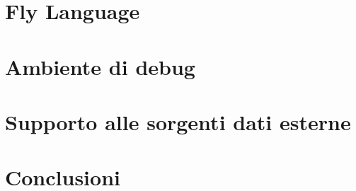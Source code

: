 \documentclass[11pt,oneside]{book}
\begin{document}
\chapter{Fly Language}


\chapter{Ambiente di debug} \label{debug}


\chapter{Supporto alle sorgenti dati esterne}


\chapter{Conclusioni}


\nocite{*}
\printbibliography[title={Bibliografia}] 

\end{document}
